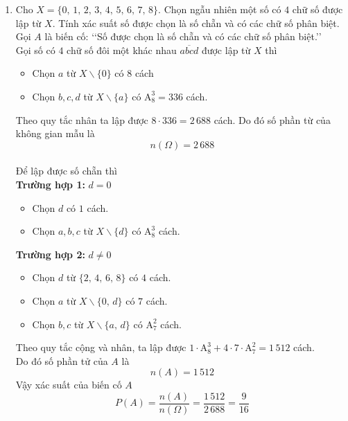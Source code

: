 \begin{bt}
{\begin{enumerate}
	\item Cho $ X = \{ 0,\,1,\,2,\,3,\,4,\,5,\,6,\,7,\,8 \} $. Chọn ngẫu nhiên một số có $ 4 $ chữ số được lập từ $ X $. Tính xác suất số được chọn là số chẵn và có các chữ số phân biệt.
	\\
	Gọi $ A $ là biến cố: \lq\lq Số được chọn là số chẵn và có các chữ số phân biệt.\rq\rq
	\\
	Gọi  số có $ 4 $ chữ số đôi một khác nhau $ \overline{abcd} $ được lập từ $ X $ thì
	\begin{itemize}
		\item Chọn $ a $ từ $ X\backslash \{ 0 \} $ có $ 8 $ cách
		\item Chọn $ b,c,d $ từ $ X \backslash \{ a \} $ có $ \mathrm{A}_{8}^{3} = 336 $ cách.
	\end{itemize}
	Theo quy tắc nhân ta lập được $ 8 \cdot 336 = 2\,688 $ cách. Do đó số phần từ của không gian mẫu là 
	$$
		n(\Omega) = 2\,688
	$$
	\\
	Để lập được số chẵn thì
	\\
	\textbf{Trường hợp 1:} $ d = 0 $
	\begin{itemize}
		\item Chọn $ d $ có $ 1 $ cách.
		\item Chọn $ a,b,c $ từ $ X \backslash \{ d \} $ có $ \mathrm{A}_{8}^{3} $ cách.
	\end{itemize}
	
	\textbf{Trường hợp 2:} $ d \ne 0 $
	\begin{itemize}
		\item Chọn $ d $ từ $ \{ 2,\,4,\,6,\,8 \} $ có $ 4 $ cách.
		\item Chọn $ a $ từ $ X \backslash \{ 0,\,d \} $ có $ 7 $ cách.
		\item Chọn $ b,c $ từ $ X \backslash \{ a,\,d \} $ có $ \mathrm{A}_{7}^{2} $ cách.
	\end{itemize}
	Theo quy tắc cộng và nhân, ta lập được $ 1 \cdot \mathrm{A}_{8}^{3} + 4 \cdot 7 \cdot \mathrm{A}_{7}^{2} = 1\,512 $ cách. 
	\\
	Do đó số phần tử của $ A $ là
	$$
		n(A) = 1\,512
	$$
	Vậy xác suất của biến cố $ A $
	$$
		P(A) = \dfrac{n(A)}{n(\Omega)}
		= \dfrac{1\,512}{2\,688} = \dfrac{9}{16}
	$$
\end{enumerate}
}
\end{bt}

